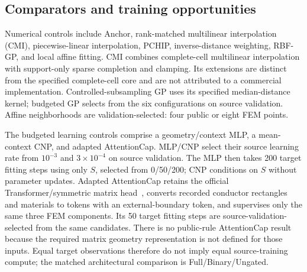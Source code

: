 \documentclass[conference,9pt,letterpaper]{IEEEtran}
\begin{document}
\subsection{Comparators and training opportunities}
Numerical controls include Anchor, rank-matched multilinear interpolation (CMI), piecewise-linear interpolation, PCHIP, inverse-distance weighting, RBF-GP, and local affine fitting. CMI combines complete-cell multilinear interpolation with support-only sparse completion and clamping. Its extensions are distinct from the specified complete-cell core and are not attributed to a commercial implementation. Controlled-subsampling GP uses its specified median-distance kernel; budgeted GP selects from the six configurations on source validation. Affine neighborhoods are validation-selected: four public or eight FEM points.

The budgeted learning controls comprise a geometry/context MLP, a mean-context CNP, and adapted AttentionCap. MLP/CNP select their source learning rate from $10^{-3}$ and $3\!\times\!10^{-4}$ on source validation. The MLP then takes 200 target fitting steps using only $S$, selected from 0/50/200; CNP conditions on $S$ without parameter updates. Adapted AttentionCap retains the official Transformer/symmetric matrix head~\cite{attentioncode}, converts recorded conductor rectangles and materials to tokens with an external-boundary token, and supervises only the same three FEM components. Its 50 target fitting steps are source-validation-selected from the same candidates. There is no public-rule AttentionCap result because the required matrix geometry representation is not defined for those inputs. Equal target observations therefore do not imply equal source-training compute; the matched architectural comparison is Full/Binary/Ungated.

\begin{table}[!t]
\centering\caption{Controlled characterization subsampling at 30\%: mean-mask macro NRMSE (lower is better). In/Out denote geometric support; Boundary is the boundary-extrapolation mask. All 15 conditions are shown. Full, Binary, and Ungated average three matched members' predictions. Bold is best among displayed methods. The controlled-subsampling GP uses its specified kernel; the budget-selected GP in Fig.~\ref{fig:budget} is a separate comparison.}
\label{tab:missing}
\small\setlength{\tabcolsep}{6pt}
\end{table}
\end{document}
